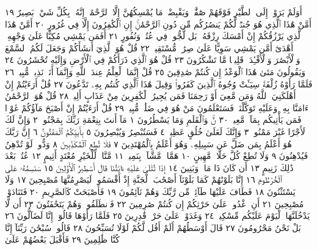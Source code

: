 أَوَلَمْ يَرَوْا۟ إِلَى ٱلطَّيْرِ فَوْقَهُمْ صَٰٓفَّٰتࣲ وَيَقْبِضْنَۚ مَا يُمْسِكُهُنَّ إِلَّا
ٱلرَّحْمَٰنُۚ إِنَّهُۥ بِكُلِّ شَيْءِۭ بَصِيرٌ ١٩ أَمَّنْ هَٰذَا ٱلَّذِي هُوَ جُندࣱ لَّكُمْ
يَنصُرُكُم مِّن دُونِ ٱلرَّحْمَٰنِۚ إِنِ ٱلْكَٰفِرُونَ إِلَّا فِي غُرُورٍ ٢٠ أَمَّنْ هَٰذَا
ٱلَّذِي يَرْزُقُكُمْ إِنْ أَمْسَكَ رِزْقَهُۥۚ بَل لَّجُّوا۟ فِي عُتُوࣲّ وَنُفُورٍ ٢١ أَفَمَن
يَمْشِي مُكِبًّا عَلَىٰ وَجْهِهِۦٓ أَهْدَىٰٓ أَمَّن يَمْشِي سَوِيًّا عَلَىٰ صِرَٰطࣲ
مُّسْتَقِيمࣲ ٢٢ قُلْ هُوَ ٱلَّذِيٓ أَنشَأَكُمْ وَجَعَلَ لَكُمُ ٱلسَّمْعَ وَٱلْأَبْصَٰرَ
وَٱلْأَفْـِٔدَةَۚ قَلِيلࣰا مَّا تَشْكُرُونَ ٢٣ قُلْ هُوَ ٱلَّذِي ذَرَأَكُمْ فِي
ٱلْأَرْضِ وَإِلَيْهِ تُحْشَرُونَ ٢٤ وَيَقُولُونَ مَتَىٰ هَٰذَا ٱلْوَعْدُ إِن كُنتُمْ
صَٰدِقِينَ ٢٥ قُلْ إِنَّمَا ٱلْعِلْمُ عِندَ ٱللَّهِ وَإِنَّمَآ أَنَا۠ نَذِيرࣱ مُّبِينࣱ ٢٦
فَلَمَّا رَأَوْهُ زُلْفَةࣰ سِيٓـَٔتْ وُجُوهُ ٱلَّذِينَ كَفَرُوا۟ وَقِيلَ هَٰذَا ٱلَّذِي كُنتُم
بِهِۦ تَدَّعُونَ ٢٧ قُلْ أَرَءَيْتُمْ إِنْ أَهْلَكَنِيَ ٱللَّهُ وَمَن مَّعِيَ أَوْ رَحِمَنَا
فَمَن يُجِيرُ ٱلْكَٰفِرِينَ مِنْ عَذَابٍ أَلِيمࣲ ٢٨ قُلْ هُوَ ٱلرَّحْمَٰنُ
ءَامَنَّا بِهِۦ وَعَلَيْهِ تَوَكَّلْنَاۖ فَسَتَعْلَمُونَ مَنْ هُوَ فِي ضَلَٰلࣲ مُّبِينࣲ ٢٩
قُلْ أَرَءَيْتُمْ إِنْ أَصْبَحَ مَآؤُكُمْ غَوْرࣰا فَمَن يَأْتِيكُم بِمَآءࣲ مَّعِينِۭ ٣٠
نٓۚ وَٱلْقَلَمِ وَمَا يَسْطُرُونَ ١ مَآ أَنتَ بِنِعْمَةِ رَبِّكَ بِمَجْنُونࣲ ٢ وَإِنَّ
لَكَ لَأَجْرًا غَيْرَ مَمْنُونࣲ ٣ وَإِنَّكَ لَعَلَىٰ خُلُقٍ عَظِيمࣲ ٤ فَسَتُبْصِرُ
وَيُبْصِرُونَ ٥ بِأَييِّكُمُ ٱلْمَفْتُونُ ٦ إِنَّ رَبَّكَ هُوَ أَعْلَمُ بِمَن ضَلَّ
عَن سَبِيلِهِۦ وَهُوَ أَعْلَمُ بِٱلْمُهْتَدِينَ ٧ فَلَا تُطِعِ ٱلْمُكَذِّبِينَ ٨
وَدُّوا۟ لَوْ تُدْهِنُ فَيُدْهِنُونَ ٩ وَلَا تُطِعْ كُلَّ حَلَّافࣲ مَّهِينٍ ١٠
هَمَّازࣲ مَّشَّآءِۭ بِنَمِيمࣲ ١١ مَّنَّاعࣲ لِّلْخَيْرِ مُعْتَدٍ أَثِيمٍ ١٢
عُتُلِّۭ بَعْدَ ذَٰلِكَ زَنِيمٍ ١٣ أَن كَانَ ذَا مَالࣲ وَبَنِينَ ١٤ إِذَا تُتْلَىٰ عَلَيْهِ
ءَايَٰتُنَا قَالَ أَسَٰطِيرُ ٱلْأَوَّلِينَ ١٥ سَنَسِمُهُۥ عَلَى ٱلْخُرْطُومِ ١٦
إِنَّا بَلَوْنَٰهُمْ كَمَا بَلَوْنَآ أَصْحَٰبَ ٱلْجَنَّةِ إِذْ أَقْسَمُوا۟ لَيَصْرِمُنَّهَا مُصْبِحِينَ ١٧ وَلَا
يَسْتَثْنُونَ ١٨ فَطَافَ عَلَيْهَا طَآئِفࣱ مِّن رَّبِّكَ وَهُمْ نَآئِمُونَ ١٩ فَأَصْبَحَتْ
كَٱلصَّرِيمِ ٢٠ فَتَنَادَوْا۟ مُصْبِحِينَ ٢١ أَنِ ٱغْدُوا۟ عَلَىٰ حَرْثِكُمْ إِن كُنتُمْ
صَٰرِمِينَ ٢٢ فَٱنطَلَقُوا۟ وَهُمْ يَتَخَٰفَتُونَ ٢٣ أَن لَّا يَدْخُلَنَّهَا ٱلْيَوْمَ عَلَيْكُم
مِّسْكِينࣱ ٢٤ وَغَدَوْا۟ عَلَىٰ حَرْدࣲ قَٰدِرِينَ ٢٥ فَلَمَّا رَأَوْهَا قَالُوٓا۟ إِنَّا
لَضَآلُّونَ ٢٦ بَلْ نَحْنُ مَحْرُومُونَ ٢٧ قَالَ أَوْسَطُهُمْ أَلَمْ أَقُل لَّكُمْ لَوْلَا
تُسَبِّحُونَ ٢٨ قَالُوا۟ سُبْحَٰنَ رَبِّنَآ إِنَّا كُنَّا ظَٰلِمِينَ ٢٩ فَأَقْبَلَ بَعْضُهُمْ عَلَىٰ
